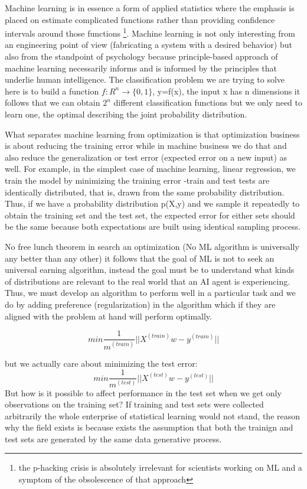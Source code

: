 \documentclass[11pt]{article}
\begin{document}
Machine learning is in essence a form of applied statistics where the emphasis is placed on estimate complicated functions rather than providing confidence intervals around those functions \footnote{the p-hacking crisis is absolutely irrelevant for scientists working on ML and a symptom of the obsolescence of that approach}. Machine learning is not only interesting from an engineering point of view (fabricating a system with a desired behavior) but also from the standpoint of psychology because principle-based approach of machine learning necessarily informs and is informed by the principles that underlie human intelligence.
The classification problem we are trying to solve here is to build a function $f:R^n \to \{0,1\}$, y=f(x), the input x has n dimensions it follows that we can obtain $2^n$ different classification functions  but we only need to learn one, the optimal describing the joint probability distribution.

What separates machine learning from optimization is that optimization business is about reducing the training error  while in machine business we do that and also reduce the generalization or test error (expected error on a new input) as well. For example, in the simplest case of machine learning, linear regression, we train the model by minimizing the training error -train and test tests are identically distributed, that is, drawn from the same probability distribution. Thus, if we have a probability distribution p(X,y) and we sample it repeatedly to obtain the training set and the test set, the expected error for either sets should be the same because both expectations are built using identical sampling process.

No free lunch theorem in search an optimization \cite{wolpert1997no} (No ML algorithm is universally any better than any other) it follows that the goal of ML is not to seek an universal earning algorithm, instead the goal must be to understand what kinds of distributions are relevant to the real world that an AI agent is experiencing. Thus, we must develop an algorithm to perform well in a particular task and we do by adding preference (regularization) in the algorithm which if they are aligned with the problem at hand will perform optimally.


\begin{equation}
min \frac{1}{m^{(train)}} ||X^{(train)}w - y^{(train)}||
\end{equation}

but we actually care about minimizing the test error:
\begin{equation}
min \frac{1}{m^{(test)}} ||X^{(test)}w - y^{(test)}||
\end{equation}
But how is it possible to affect performance in the test set when we get only observations on the training set? If training and test sets were collected arbitrarily the whole enterprise of statistical learning would not stand, the reason why the field exists is because exists the assumption that both the trainign and test sets are generated by the same data generative process.
\end{document}

